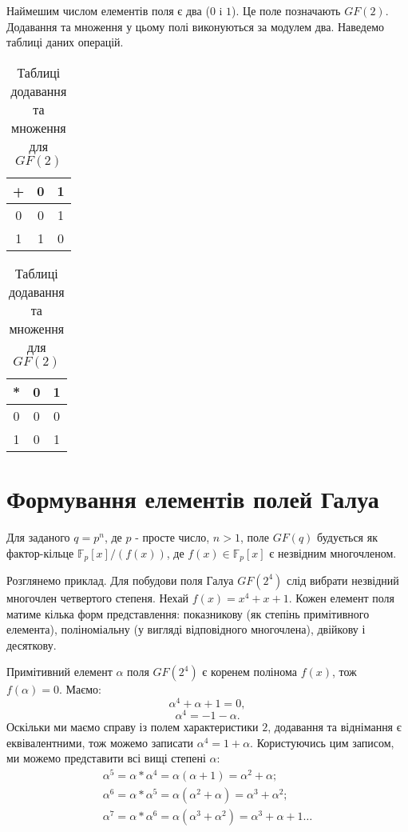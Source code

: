 Наймешим числом елементів поля є два ($0$ i $1$). Це поле позначають $GF(2)$. Додавання та множення у цьому полі виконуються за модулем два. Наведемо таблиці даних операцій.

\begin{table}[h!]
  \centering
  \normalsize 
\begin{tabular}{|c||c|c|}
\hline
+&0&1\\
\hline
\hline
0&0&1\\
\hline
1&1&0\\
\hline
\end{tabular}
\quad \quad \quad
\begin{tabular}{|c||c|c|}
\hline
*&0&1\\
\hline
\hline
0&0&0\\
\hline
1&0&1\\
\hline
\end{tabular}

\caption{Таблиці додавання та множення для $GF(2)$}

\end{table}
\section{Формування елементів полей Галуа}
\label{section.1.5}

Для заданого $q=p^n$, де $p$ - просте число, $n>1$, поле $GF(q)$ будується як фактор-кільце $\mathbb{F}_p[x] / (f(x))$, де $f(x) \in \mathbb{F}_p[x]$ є незвідним многочленом.

Розглянемо приклад. Для побудови поля Галуа $GF(2^4)$ слід вибрати незвідний многочлен четвертого степеня. Нехай $f(x)=x^4+x+1$. Кожен елемент поля матиме кілька форм представлення: показникову (як степінь примітивного елемента), поліноміальну (у вигляді відповідного многочлена), двійкову і десяткову.

Примітивний елемент $\alpha$ поля $GF(2^4)$ є коренем полінома $f(x)$, тож $f(\alpha)=0$. Маємо:  
\[
\alpha^4+\alpha+1=0,
\]
\[
\alpha^4=-1-\alpha.
\]
Оскільки ми маємо справу із полем характеристики $2$, додавання та віднімання є еквівалентними, тож можемо записати $\alpha^4=1+\alpha$. Користуючись цим записом, ми можемо представити всі вищі степені $\alpha$:
\begin{multline*}
\alpha^5=\alpha * \alpha^4 = \alpha (\alpha+1) = \alpha^2 + \alpha; \\
\alpha^6=\alpha * \alpha^5 = \alpha (\alpha^2+\alpha) = \alpha^3 + \alpha^2;\\
\alpha^7=\alpha * \alpha^6 = \alpha (\alpha^3+\alpha^2) = \alpha^3 + \alpha + 1 \ldots
\end{multline*}

